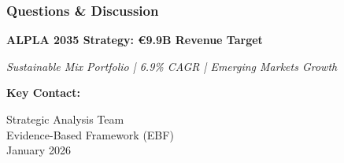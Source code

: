 \documentclass[aspectratio=169,12pt,xcolor=dvipsnames]{beamer}
\newcommand{\highlight}[1]{{\color{alpla_blue}\textbf{#1}}}
\begin{document}

\begin{frame}
  \frametitle{Questions \& Discussion}

  \centering

  \vspace{2cm}

  \Large
  \highlight{\textbf{ALPLA 2035 Strategy: €9.9B Revenue Target}}

  \vspace{0.5cm}

  \large
  \textit{Sustainable Mix Portfolio | 6.9\% CAGR | Emerging Markets Growth}

  \vspace{2cm}

  \normalsize

  \textbf{Key Contact:}

  Strategic Analysis Team \\
  Evidence-Based Framework (EBF) \\
  January 2026

\end{frame}


\appendix
\end{document}
